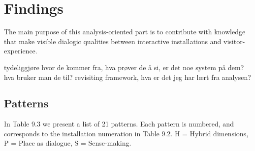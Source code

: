 \section{Findings}
The main purpose of this analysis-oriented part is to contribute with knowledge that make visible dialogic qualities between interactive installations and visitor-experience. 


tydeliggjøre hvor de kommer fra, hva prøver de å si, er det noe system på dem? hva bruker man de til?
revisiting framework, hva er det jeg har lært fra analysen?



\subsection{Patterns}
In Table 9.3 we present a list of 21 patterns. Each pattern is numbered, and corresponds to the installation numeration in Table 9.2. H = Hybrid dimensions, P = Place as dialogue, S = Sense-making.

